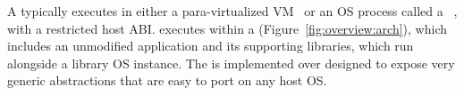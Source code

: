 \label{sec:overview:libos:arch}

A \libos{} typically executes in either a para-virtualized VM~\cite{unikernels,osv}
or an OS process called a \emph{\picoproc{}}~\cite{porter11drawbridge,baumann13bascule}, with a restricted host ABI.
\graphene{} executes within a \picoproc{} (Figure~\ref{fig:overview:arch}),
which includes an unmodified application and its supporting libraries, which run alongside a library OS instance.
The \graphene{} \libos{} is implemented over \thehostabi{} designed to expose very generic abstractions that are easy to port on any host OS.


